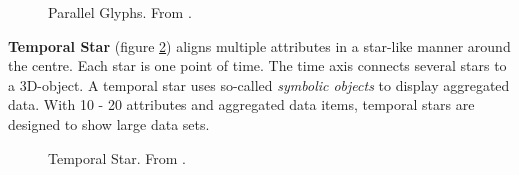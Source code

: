 \begin{figure}[H]
    \centering
    \caption[Parallel Glyphs]{Parallel Glyphs. From  \cite{Aigner2011}.}
    \label{fig:parallelglyphs}
\end{figure}\par

\textbf{Temporal Star} (figure \ref{fig:temporalstar}) aligns multiple attributes in a star-like manner around the centre. Each star is one point of time. The time axis connects several stars to a 3D-object. A temporal star uses so-called \textit{symbolic objects} to display aggregated data. With 10 - 20 attributes and aggregated data items, temporal stars are designed to show large data sets. 
\begin{figure}[H]
    \centering
    \caption[Temporal Star]{Temporal Star. From  \cite{Aigner2011}.}
    \label{fig:temporalstar}
\end{figure}\par

